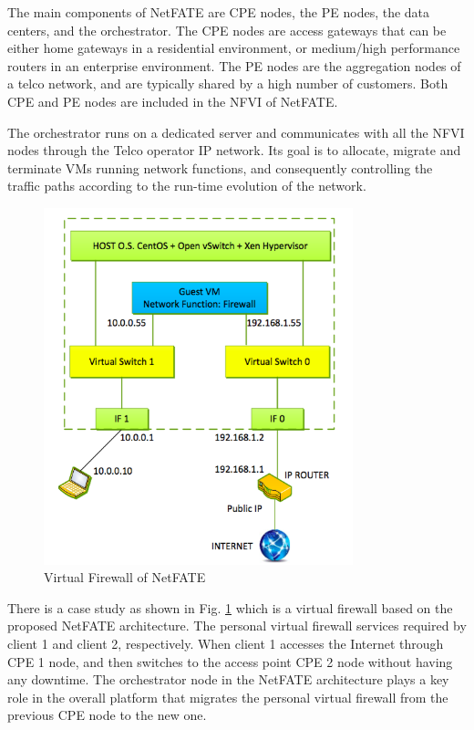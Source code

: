 The main components of NetFATE are CPE nodes, the PE nodes, the data centers, and the orchestrator.
The CPE nodes are access gateways that can be either home gateways in a residential environment, or medium/high performance routers in an enterprise environment.
The PE nodes are the aggregation nodes of a telco network, and are typically shared by a high number of customers. Both CPE and PE nodes are included in the NFVI of NetFATE.

The orchestrator runs on a dedicated server and communicates with all the NFVI nodes through the Telco operator IP network. Its goal is to allocate, migrate and terminate VMs running network functions, and consequently controlling the traffic paths according to the run-time evolution of the network.

\begin{figure}[!ht]
\centering
\includegraphics[width=0.8\textwidth]{./fig/netfate.png}
\caption{Virtual Firewall of NetFATE \cite{netfate}}
\label{fig:netfate}
\end{figure}

There is a case study as shown in Fig. \ref{fig:netfate} which is a virtual firewall based on the proposed NetFATE architecture. The personal virtual firewall services required by client 1 and client 2, respectively. When client 1 accesses the Internet through CPE 1 node, and then switches to the access point CPE 2 node without having any downtime. The orchestrator node in the NetFATE architecture plays a key role in the overall platform that migrates the personal virtual firewall from the previous CPE node to the new one.

